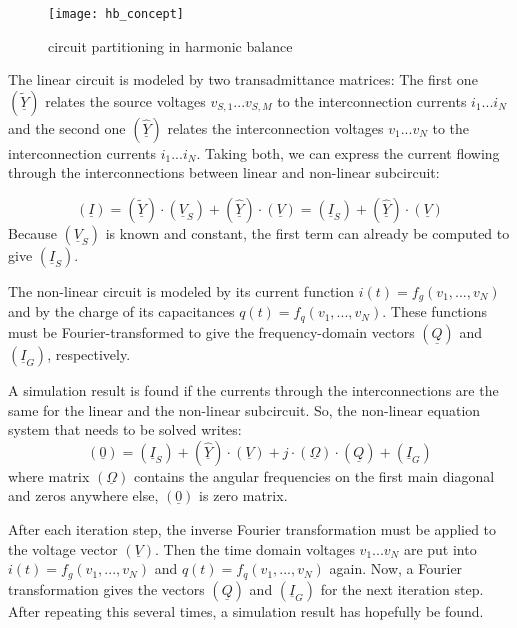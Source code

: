 \begin{figure}[ht]
\begin{center}
\texttt{[image: hb\_concept]}
\end{center}
\caption{circuit partitioning in harmonic balance}
\label{fig:hb_concept}
\end{figure}
\FloatBarrier

The linear circuit is modeled by two transadmittance matrices:
The first one $(\tilde{\underline{Y}})$
relates the source voltages $v_{S,1}...v_{S,M}$ to the interconnection
currents $i_1...i_N$ and the second one $(\hat{\underline{Y}})$
relates the interconnection
voltages $v_1...v_N$ to the interconnection currents $i_1...i_N$.
Taking both, we can express the current flowing through the
interconnections between linear and non-linear subcircuit:

\begin{equation}
\label{eqn:HBlin}
(\underline{I})
  = (\underline{\tilde{Y}})\cdot (\underline{V}_S) + (\underline{\hat{Y}})\cdot (\underline{V})
  = (\underline{I}_S) + (\underline{\hat{Y}})\cdot (\underline{V})
\end{equation}
Because $(\underline{V}_S)$ is known and constant, the first term
can already be computed to give $(\underline{I}_S)$.

\addvspace{12pt}

The non-linear circuit is modeled by its current function
$i(t) = f_g(v_1, ..., v_N)$
and by the charge of its capacitances
$q(t) = f_q(v_1, ..., v_N)$.
These functions must be Fourier-transformed to give the
frequency-domain vectors $(\underline{Q})$ and $(\underline{I}_G)$,
respectively.

\addvspace{12pt}

A simulation result is found if the currents through the
interconnections are the same for the linear and the non-linear
subcircuit. So, the non-linear equation system that needs to be
solved writes:
\begin{equation}
(\underline{0})
  = (\underline{I}_S) + (\underline{\hat{Y}})\cdot (\underline{V})
    + j\cdot (\underline{\Omega})\cdot (\underline{Q}) + (\underline{I}_G)
\end{equation}
where matrix $(\underline{\Omega})$ contains the angular frequencies
on the first main diagonal and zeros anywhere else, $(\underline{0})$
is zero matrix.

\addvspace{12pt}

After each iteration step, the inverse Fourier transformation must
be applied to the voltage vector $(\underline{V})$. Then the time domain
voltages $v_1...v_N$ are put into $i(t) = f_g(v_1, ..., v_N)$
and $q(t) = f_q(v_1, ..., v_N)$ again. Now, a Fourier transformation
gives the vectors $(\underline{Q})$ and $(\underline{I}_G)$ for the
next iteration step. After repeating this several times, a simulation
result has hopefully be found.

